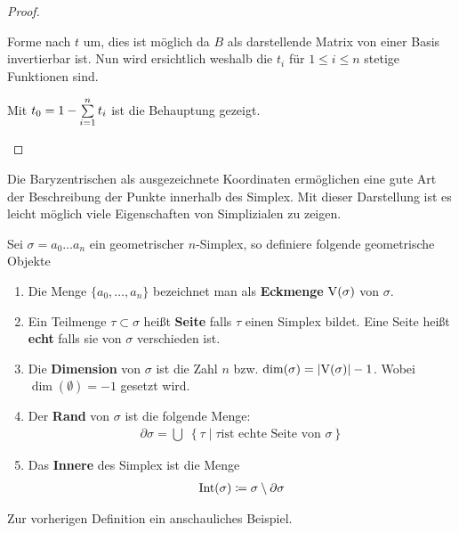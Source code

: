 \begin{Lem}
\begin{proof}
\begin{description}
      Forme nach $t$ um, dies ist möglich da $B$ als darstellende
      Matrix von einer Basis invertierbar ist. Nun wird ersichtlich
      weshalb die $t_i$ für $1 \leq i \leq n$ stetige Funktionen sind.

      Mit $t_0 = 1 - \sp{1}{n} t_i$ ist die Behauptung gezeigt.
    \end{description}
  \end{proof}
\end{Lem}

Die Baryzentrischen als ausgezeichnete Koordinaten ermöglichen eine
gute Art der Beschreibung der Punkte innerhalb des Simplex. Mit dieser
Darstellung ist es leicht möglich viele Eigenschaften von Simplizialen
zu zeigen.

\begin{Def}
  Sei $\sigma = a_0 \ldots a_n$ ein geometrischer $n$-Simplex, so
  definiere folgende geometrische Objekte
  \begin{enumerate}[\textbullet]%
  \item Die Menge $\{ a_0 , \ldots , a_n \}$ bezeichnet man als
    \textbf{Eckmenge} $\V(\sigma)$ von $\sigma$.
  \item Ein Teilmenge $\tau \subset \sigma$ heißt \textbf{Seite} falls
    $\tau$ einen Simplex bildet. Eine Seite heißt \textbf{echt} falls
    sie von $\sigma$ verschieden ist.
  \item Die \textbf{Dimension} von $\sigma$ ist die Zahl $n$ bzw.
    $\dim(\sigma) = \gr{\V(\sigma)} - 1$. Wobei $\dim(\emptyset)=-1$
    gesetzt wird.
  \item Der \textbf{Rand} von $\sigma$ ist die folgende Menge:
    \begin{gather*}
      \partial\sigma = \bigcup \; \left\{ \tau \; \Big| \; \tau \text{
          ist echte Seite von } \sigma \right\}
    \end{gather*}
  \item Das \textbf{Innere} des Simplex ist die Menge
    \begin{gather*}
    	\Int(\sigma) \coloneqq \sigma \setminus \partial\sigma
    \end{gather*}
  \end{enumerate}
\end{Def}

Zur vorherigen Definition ein anschauliches Beispiel.

